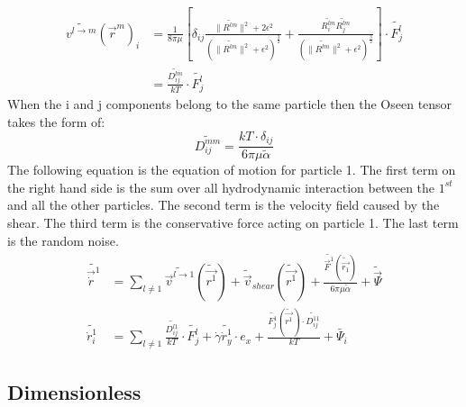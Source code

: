 \documentclass{article}
\begin{document}
\begin{align}
        \widetilde{v^{l \to m}}(\vec{r}^{m})_i &= \frac{1}{8 \pi \mu } \left[ \delta_{ij} \frac{\|\widetilde{R^{lm}}\|^2 + 2\epsilon^2}{(\|\widetilde{R^{lm}}\|^2 + \epsilon ^2)^\frac{3}{2}} + \frac{\widetilde{R_i^{lm}} \widetilde{R_j^{lm}}}{(\|\widetilde{R^{lm}}\|^2 + \epsilon ^2)^\frac{3}{2}} \right]\cdot \widetilde{F^{l}_{j}} \\
        &= \frac{\widetilde{D_{ij}^{lm}}}{kT} \cdot \widetilde{F^{l}_{j}}
\end{align}
When the i and j components belong to the same particle then the Oseen tensor takes the form of: $$\widetilde{ D_{ij}^{mm}} = \frac{kT \cdot \delta_{ij}}{6 \pi \mu \widetilde{\alpha}} $$
The following equation is the equation of motion for particle 1. The first term on the right hand side is the sum over all hydrodynamic interaction between the $1^ {st}$ and all the other particles. The second term is the velocity field caused by the shear. The third term is the conservative force acting on particle 1. The last term is the random noise.
\begin{align}
   \widetilde{ \vec{\dot{r}}^{1}} &= \sum_{l \neq 1}  \widetilde{\vec{v}^{l \to 1}}(\widetilde{\vec{r^{1}}}) +  \widetilde{\vec{v}}_{shear}(\widetilde{\vec{r^{1}}}) + \frac{\widetilde{\vec{F}^{1}}(\widetilde{\vec{r_{1}}})}{6\pi \mu \tilde{\alpha} } +\widetilde{\vec{\Psi}} \\
    \widetilde{\dot{r}_{i}^{1}} &= \sum_{l \neq 1}  \frac{\widetilde{D_{ij}^{l1}} }{kT} \cdot \widetilde{F^{l}_{j}} + \dot{\gamma} \widetilde{\dot{r}_{y}^{1}}\cdot e_{x} + \frac{\widetilde{F^{1}_{j}} (\widetilde{\vec{r^{1}}}) \cdot \widetilde{D_{ij}^{11}} }{kT } +\widetilde{\Psi_{i}}
\end{align}


\subsection{Dimensionless}
\end{document}
